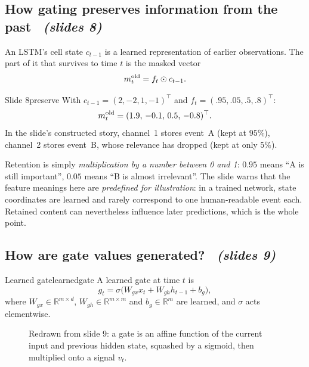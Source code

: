 \documentclass[11pt,a4paper]{article}
\newcommand{\R}{\mathbb{R}}
\newcommand{\sltag}[1]{\texorpdfstring{\ \emph{(slides #1)}}{ (slides #1)}}
\begin{document}
\subsection{How gating preserves information from the past \sltag{8}}

An LSTM's cell state $c_{t-1}$ is a learned representation of earlier observations. The part of it that survives to time $t$ is the masked vector
\[
m_t^{\rm old}=f_t\odot c_{t-1}.
\]
\begin{example}{Slide 8}{preserve}
With $c_{t-1}=(2,-2,1,-1)^\top$ and $f_t=(.95,.05,.5,.8)^\top$:
\[
m_t^{\rm old}=(1.9,\,-0.1,\,0.5,\,-0.8)^\top .
\]
In the slide's constructed story, channel~1 stores event~A (kept at $95\%$), channel~2 stores event~B, whose relevance has dropped (kept at only $5\%$).
\end{example}

\begin{intuition}
Retention is simply \emph{multiplication by a number between 0 and 1}: $0.95$ means ``A is still important'', $0.05$ means ``B is almost irrelevant''. The slide warns that the feature meanings here are \emph{predefined for illustration}: in a trained network, state coordinates are learned and rarely correspond to one human-readable event each. Retained content can nevertheless influence later predictions, which is the whole point.
\end{intuition}

\subsection{How are gate values generated? \sltag{9}}

\begin{definition}{Learned gate}{learnedgate}
A learned gate at time $t$ is
\[
g_t=\sigma\big(W_{gx}x_t+W_{gh}h_{t-1}+b_g\big),
\]
where $W_{gx}\in\R^{m\times d}$, $W_{gh}\in\R^{m\times m}$ and $b_g\in\R^m$ are learned, and $\sigma$ acts elementwise.
\end{definition}

\begin{figure}[H]\centering
{}
\caption{Redrawn from slide 9: a gate is an affine function of the current input and previous hidden state, squashed by a sigmoid, then multiplied onto a signal $v_t$.}
\end{figure}
\end{document}
